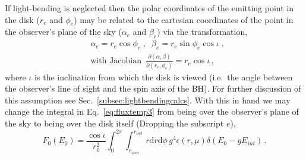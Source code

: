 If light-bending is neglected then the polar coordinates of the emitting point in the disk ($r_{e}$ and $\phi_{e}$) may be related to the cartesian coordinates of the point in the observer's plane of the sky ($\alpha_{e}$ and $\beta_{e}$) via the transformation,
\begin{eqnarray}\label{eq:negligiblelightbenging} 
& \alpha_{e}=r_{e}\cos\phi_{e} \; , \;\; \beta_{e}=r_{e}\sin\phi_{e}\cos \iota\; , \nonumber \\
&\textrm{with Jacobian }\, \frac{\partial (\alpha,\beta)}{\partial (r_{e},\phi_{e})}=r_{e}\cos \iota \, ,\end{eqnarray}
where $\iota$ is the inclination from which the disk is viewed (i.e.\ the angle between the observer's line of sight and the spin axis of the BH). For further discussion of this assumption see Sec.\ \ref{subsec:lightbendingcalcs}. With this in hand we may change the integral in Eq.\ \ref{eq:fluxtemp3} from being over the observer's plane of the sky to being over the disk itself (Dropping the subscript $e$),
\begin{equation}\label{eq:fluxtemp4} F_{0}(E_{0})=\frac{\cos \iota}{r_{0}^{2}}\int_{0}^{2\pi}\int_{r_{isco}}^{r_{out}}r\textrm{d}r \textrm{d}\phi\, g^{4}\epsilon (r,\mu)\delta\left(E_{0}-gE_{int}\right)\, .\end{equation}

